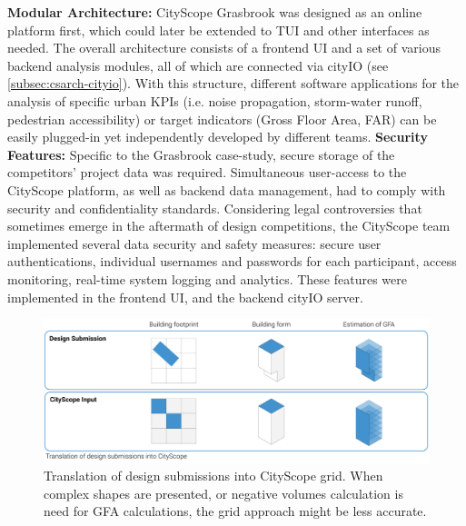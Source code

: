 {{        \textbf{Modular Architecture:} CityScope Grasbrook was designed as an online platform first, which could later be extended to TUI and other interfaces as needed. The overall architecture consists of a frontend UI and a set of various backend analysis modules, all of which are connected via cityIO (see \eqref{subsec:csarch-cityio}). With this structure, different software applications for the analysis of specific urban KPIs (i.e. noise propagation, storm-water runoff, pedestrian accessibility) or target indicators (Gross Floor Area, FAR) can be easily plugged-in yet independently developed by different teams.
        \newline
        \textbf{Security Features:} Specific to the Grasbrook case-study, secure storage of the competitors' project data was required. Simultaneous user-access to the CityScope platform, as well as backend data management, had to comply with security and confidentiality standards. Considering legal controversies that sometimes emerge in the aftermath of design competitions, the CityScope team implemented several data security and safety measures: secure user authentications, individual usernames and passwords for each participant, access monitoring, real-time system logging and analytics. These features were implemented in the frontend UI, and the backend cityIO server.


        \begin{figure}[!htb]
            \begin{center}
                \includegraphics[width=1\textwidth]{chapters/transformation/grasbrook/figures/grsbrk4.jpg}
            \end{center}
            \caption{Translation of design submissions into CityScope grid. When complex shapes are presented, or negative volumes calculation is need for GFA calculations, the grid approach might be less accurate.}
            \label{fig:grasbrook_pixel_translation}
        \end{figure}
    }


}
